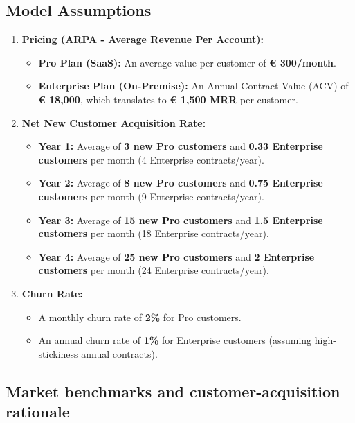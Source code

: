 \subsection{Model Assumptions}
\begin{enumerate}
    \item \textbf{Pricing (ARPA - Average Revenue Per Account):}
    \begin{itemize}
        \item \textbf{Pro Plan (SaaS):} An average value per customer of \textbf{\euro{} 300/month}.
        \item \textbf{Enterprise Plan (On-Premise):} An Annual Contract Value (ACV) of \textbf{\euro{} 18,000}, which translates to \textbf{\euro{} 1,500 MRR} per customer.
    \end{itemize}

    \item \textbf{Net New Customer Acquisition Rate:}
    \begin{itemize}
        \item \textbf{Year 1:} Average of \textbf{3 new Pro customers} and \textbf{0.33 Enterprise customers} per month (4 Enterprise contracts/year).
        \item \textbf{Year 2:} Average of \textbf{8 new Pro customers} and \textbf{0.75 Enterprise customers} per month (9 Enterprise contracts/year).
        \item \textbf{Year 3:} Average of \textbf{15 new Pro customers} and \textbf{1.5 Enterprise customers} per month (18 Enterprise contracts/year).
        \item \textbf{Year 4:} Average of \textbf{25 new Pro customers} and \textbf{2 Enterprise customers} per month (24 Enterprise contracts/year).
    \end{itemize}

    \item \textbf{Churn Rate:}
    \begin{itemize}
        \item A monthly churn rate of \textbf{2\%} for Pro customers.
        \item An annual churn rate of \textbf{1\%} for Enterprise customers (assuming high-stickiness annual contracts).
    \end{itemize}
\end{enumerate}

\subsection{Market benchmarks and customer-acquisition rationale}

